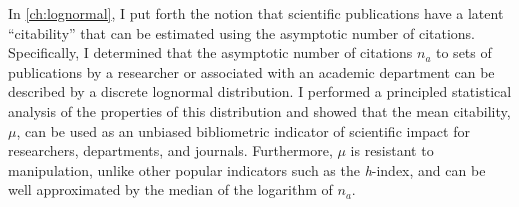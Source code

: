 In \autoref{ch:lognormal}, I put forth the notion that scientific publications have a latent ``citability'' that can be estimated using the asymptotic number of citations. Specifically, I determined that the asymptotic number of citations $n_a$ to sets of publications by a researcher or associated with an academic department can be described by a discrete lognormal distribution. I performed a principled statistical analysis of the properties of this distribution and showed that the mean citability, $\mu$, can be used as an unbiased bibliometric indicator of scientific impact for researchers, departments, and journals. Furthermore, $\mu$ is resistant to manipulation, unlike other popular indicators such as the \emph{h}-index, and can be well approximated by the median of the logarithm of $n_a$.
